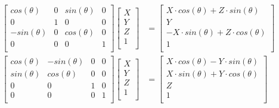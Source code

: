 \begin{align*}
\begin{bmatrix}
  cos\left(\theta\right) & 0 & sin\left(\theta\right) & 0 \\
  0 & 1 & 0 & 0 \\
  -sin\left(\theta\right) & 0 & cos\left(\theta\right) & 0 \\
  0 & 0 & 0 & 1 \\
\end{bmatrix}
\begin{bmatrix}
  X \\
  Y \\
  Z \\
  1 \\
\end{bmatrix} &=
\begin{bmatrix}
  X \cdot cos\left(\theta\right) + Z \cdot sin\left(\theta\right) \\
  Y \\
  -X \cdot sin\left(\theta\right) + Z \cdot cos\left(\theta\right) \\
  1 \\
\end{bmatrix} \\
\begin{bmatrix}
  cos\left(\theta\right) & -sin\left(\theta\right) & 0 & 0 \\
  sin\left(\theta\right) & cos\left(\theta\right) & 0 & 0 \\
  0 & 0 & 1 & 0 \\
  0 & 0 & 0 & 1 \\
\end{bmatrix}
\begin{bmatrix}
  X \\
  Y \\
  Z \\
  1 \\
\end{bmatrix} &=
\begin{bmatrix}
  X \cdot cos\left(\theta\right) - Y \cdot sin\left(\theta\right) \\
  X \cdot sin\left(\theta\right) + Y \cdot cos\left(\theta\right) \\
  Z \\
  1 \\
\end{bmatrix}
\end{align*}


